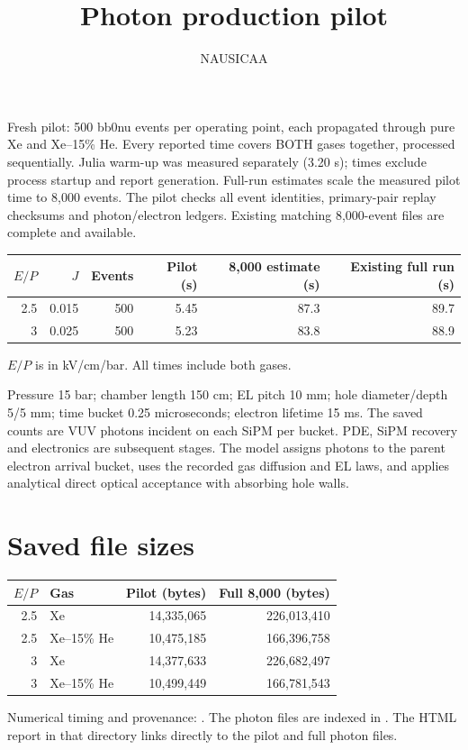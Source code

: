 \documentclass[10pt,a4paper]{article}
\begin{document}
\title{Photon production pilot}\author{NAUSICAA}\date{}\maketitle
Fresh pilot: 500 bb0nu events per operating point, each propagated through pure Xe and Xe--15\% He. Every reported time covers BOTH gases together, processed sequentially. Julia warm-up was measured separately (3.20 s); times exclude process startup and report generation. Full-run estimates scale the measured pilot time to 8,000 events. The pilot checks all event identities, primary-pair replay checksums and photon/electron ledgers. Existing matching 8,000-event files are complete and available.
\begin{center}\begin{tabular}{rrrrrr}\toprule
$E/P$ & $J$ & Events & Pilot (s) & 8,000 estimate (s) & Existing full run (s)\\\midrule
2.5 & 0.015 & 500 & 5.45 & 87.3 & 89.7 \\
3 & 0.025 & 500 & 5.23 & 83.8 & 88.9 \\
\bottomrule\end{tabular}\end{center}
$E/P$ is in kV/cm/bar. All times include both gases.

Pressure 15 bar; chamber length 150 cm; EL pitch 10 mm; hole diameter/depth 5/5 mm; time bucket 0.25 microseconds; electron lifetime 15 ms. The saved counts are VUV photons incident on each SiPM per bucket. PDE, SiPM recovery and electronics are subsequent stages. The model assigns photons to the parent electron arrival bucket, uses the recorded gas diffusion and EL laws, and applies analytical direct optical acceptance with absorbing hole walls.
\section*{Saved file sizes}
\begin{center}\begin{tabular}{rlrr}\toprule
$E/P$ & Gas & Pilot (bytes) & Full 8,000 (bytes)\\\midrule
2.5 & Xe & 14,335,065 & 226,013,410 \\
2.5 & Xe--15\% He & 10,475,185 & 166,396,758 \\
3 & Xe & 14,377,633 & 226,682,497 \\
3 & Xe--15\% He & 10,499,449 & 166,781,543 \\
\bottomrule\end{tabular}\end{center}
Numerical timing and provenance: .
The photon files are indexed in .
The HTML report in that directory links directly to the pilot and full photon files.
\end{document}
